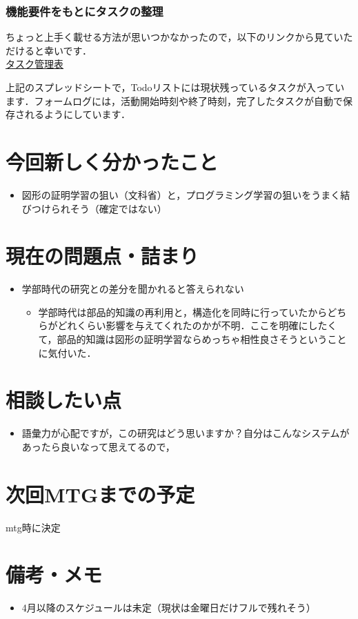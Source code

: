 \documentclass[a4paper,12pt]{ltjsarticle}
\begin{document}
\subsubsection{機能要件をもとにタスクの整理}
ちょっと上手く載せる方法が思いつかなかったので，以下のリンクから見ていただけると幸いです．\\

\href{https://docs.google.com/spreadsheets/d/1bc6ZpAYn9_rqxhomlmbGAN_Oicu0uma-P-dEPIwMabg/edit?usp=sharing}{タスク管理表}

上記のスプレッドシートで，Todoリストには現状残っているタスクが入っています．フォームログには，活動開始時刻や終了時刻，完了したタスクが自動で保存されるようにしています．
\newpage

\section{今回新しく分かったこと}
\begin{itemize}
  \item 図形の証明学習の狙い（文科省）と，プログラミング学習の狙いをうまく結びつけられそう（確定ではない）
\end{itemize}

\section{現在の問題点・詰まり}
\begin{itemize}
  \item 学部時代の研究との差分を聞かれると答えられない
  \begin{itemize}
    \item 学部時代は部品的知識の再利用と，構造化を同時に行っていたからどちらがどれくらい影響を与えてくれたのかが不明．ここを明確にしたくて，部品的知識は図形の証明学習ならめっちゃ相性良さそうということに気付いた．
  \end{itemize}
\end{itemize}

\section{相談したい点}
\begin{itemize}
  \item 語彙力が心配ですが，この研究はどう思いますか？自分はこんなシステムがあったら良いなって思えてるので，
\end{itemize}

\section{次回MTGまでの予定}
mtg時に決定

\section*{備考・メモ}
\begin{itemize}
  \item 4月以降のスケジュールは未定（現状は金曜日だけフルで残れそう）
\end{itemize}
\end{document}

